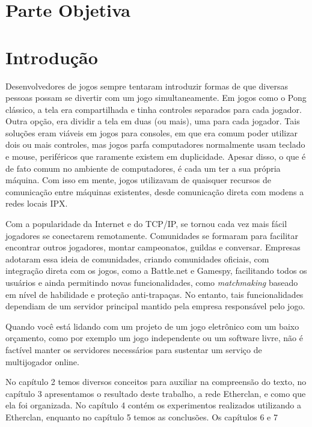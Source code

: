 \chapter*{Parte Objetiva}
\label{sec:parte_objetiva}
\chapter{Introdução}
\label{sec:intr}

Desenvolvedores de jogos sempre tentaram introduzir formas de que diversas
pessoas possam se divertir com um jogo simultaneamente. Em jogos como o Pong
clássico, a tela era compartilhada e tinha controles separados para cada 
jogador. Outra opção, era dividir a tela em duas (ou mais), uma para cada
jogador. Tais soluções eram viáveis em jogos para consoles, em que era comum
poder utilizar dois ou mais controles, mas jogos parfa computadores normalmente
usam teclado e mouse, periféricos que raramente existem em duplicidade.
Apesar disso, o que é de fato comum no ambiente de computadores, é cada um ter
a sua própria máquina. Com isso em mente, jogos utilizavam de quaisquer recursos
de comunicação entre máquinas existentes, desde comunicação direta com modens
a redes locais IPX.

Com a popularidade da Internet e do TCP/IP, se tornou cada vez mais fácil
jogadores se conectarem remotamente. Comunidades se formaram para facilitar
encontrar outros jogadores, montar campeonatos, guildas e conversar. Empresas
adotaram essa ideia de comunidades, criando comunidades oficiais, com integração
direta com os jogos, como a Battle.net e Gamespy, facilitando todos os usuários 
e ainda permitindo novas funcionalidades, como \textit{matchmaking} baseado em
nível de habilidade e proteção anti-trapaças. No entanto, tais funcionalidades
dependiam de um servidor principal mantido pela empresa responsável pelo jogo.

Quando você está lidando com um projeto de um jogo eletrônico com um baixo
orçamento, como por exemplo um jogo independente ou um software livre, não é
factível manter os servidores necessários para sustentar um serviço de
multijogador online.

No capítulo 2 temos diversos conceitos para auxiliar na compreensão do texto,
no capítulo 3 apresentamos o resultado deste trabalho, a rede Etherclan, e como
que ela foi organizada. No capítulo 4 contém os experimentos realizados utilizando
a Etherclan, enquanto no capítulo 5 temos as conclusões. Os capítulos 6 e 7 

